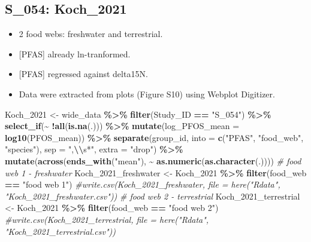 \documentclass[
]{article}
\newenvironment{Shaded}{\begin{snugshade}}{\end{snugshade}}
\newcommand{\AttributeTok}[1]{\textcolor[rgb]{0.13,0.29,0.53}{#1}}
\newcommand{\CommentTok}[1]{\textcolor[rgb]{0.56,0.35,0.01}{\textit{#1}}}
\newcommand{\FunctionTok}[1]{\textcolor[rgb]{0.13,0.29,0.53}{\textbf{#1}}}
\newcommand{\NormalTok}[1]{#1}
\newcommand{\OtherTok}[1]{\textcolor[rgb]{0.56,0.35,0.01}{#1}}
\newcommand{\SpecialCharTok}[1]{\textcolor[rgb]{0.81,0.36,0.00}{\textbf{#1}}}
\newcommand{\StringTok}[1]{\textcolor[rgb]{0.31,0.60,0.02}{#1}}
\providecommand{\tightlist}{%
  \setlength{\itemsep}{0pt}\setlength{\parskip}{0pt}}
\begin{document}
\subsection{S\_054: Koch\_2021}\label{s_054-koch_2021}

\begin{itemize}
\tightlist
\item
  2 food webs: freshwater and terrestrial.
\item
  {[}PFAS{]} already ln-tranformed.
\item
  {[}PFAS{]} regressed against delta15N.
\item
  Data were extracted from plots (Figure S10) using Webplot Digitizer.
\end{itemize}

\begin{Shaded}
\begin{Highlighting}[]
\NormalTok{Koch\_2021 }\OtherTok{\textless{}{-}}\NormalTok{ wide\_data }\SpecialCharTok{\%\textgreater{}\%} 
  \FunctionTok{filter}\NormalTok{(Study\_ID }\SpecialCharTok{==} \StringTok{"S\_054"}\NormalTok{) }\SpecialCharTok{\%\textgreater{}\%}
  \FunctionTok{select\_if}\NormalTok{(}\SpecialCharTok{\textasciitilde{}} \SpecialCharTok{!}\FunctionTok{all}\NormalTok{(}\FunctionTok{is.na}\NormalTok{(.))) }\SpecialCharTok{\%\textgreater{}\%}
  \FunctionTok{mutate}\NormalTok{(}\AttributeTok{log\_PFOS\_mean =} \FunctionTok{log10}\NormalTok{(PFOS\_mean)) }\SpecialCharTok{\%\textgreater{}\%} 
  \FunctionTok{separate}\NormalTok{(group\_id, }\AttributeTok{into =} \FunctionTok{c}\NormalTok{(}\StringTok{"PFAS"}\NormalTok{, }\StringTok{"food\_web"}\NormalTok{, }\StringTok{"species"}\NormalTok{), }\AttributeTok{sep =} \StringTok{",}\SpecialCharTok{\textbackslash{}\textbackslash{}}\StringTok{s*"}\NormalTok{, }\AttributeTok{extra =} \StringTok{"drop"}\NormalTok{) }\SpecialCharTok{\%\textgreater{}\%} 
  \FunctionTok{mutate}\NormalTok{(}\FunctionTok{across}\NormalTok{(}\FunctionTok{ends\_with}\NormalTok{(}\StringTok{"mean"}\NormalTok{), }\SpecialCharTok{\textasciitilde{}} \FunctionTok{as.numeric}\NormalTok{(}\FunctionTok{as.character}\NormalTok{(.))))}
\CommentTok{\# food web 1 {-} freshwater}
\NormalTok{Koch\_2021\_freshwater }\OtherTok{\textless{}{-}}\NormalTok{ Koch\_2021 }\SpecialCharTok{\%\textgreater{}\%} 
  \FunctionTok{filter}\NormalTok{(food\_web }\SpecialCharTok{==} \StringTok{"food web 1"}\NormalTok{)}
\CommentTok{\#write.csv(Koch\_2021\_freshwater, file = here("Rdata", "Koch\_2021\_freshwater.csv"))}
\CommentTok{\# food web 2 {-} terrestrial}
\NormalTok{Koch\_2021\_terrestrial }\OtherTok{\textless{}{-}}\NormalTok{ Koch\_2021 }\SpecialCharTok{\%\textgreater{}\%} 
  \FunctionTok{filter}\NormalTok{(food\_web }\SpecialCharTok{==} \StringTok{"food web 2"}\NormalTok{)}
\CommentTok{\#write.csv(Koch\_2021\_terrestrial, file = here("Rdata", "Koch\_2021\_terrestrial.csv"))}
\end{Highlighting}
\end{Shaded}
\end{document}
